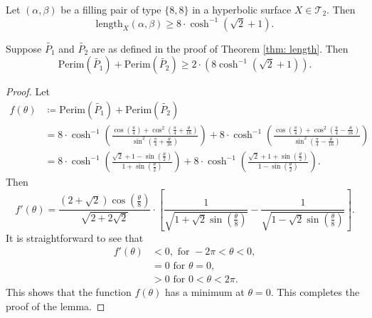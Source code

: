 \documentclass[10pt,a4paper]{amsart}
\begin{document}
\begin{theorem}\label{thm: length}
    Let $(\alpha, \beta)$ be a filling pair of type $\{8,8\}$ in a hyperbolic surface $X\in \mathcal{T}_2$. Then
    $$\mathrm{length}_X(\alpha,\beta) \geq 8\cdot\cosh^{-1}\left(\sqrt{2}+1\right).$$
\end{theorem}

\begin{lemma}\label{lem 1.2}
    Suppose $\tilde{P_1}$ and $\tilde{P_2}$ are as defined in the proof of Theorem \ref{thm: length}. Then 
    $$\mathrm{Perim}(\tilde{P_1})+\mathrm{Perim}(\tilde{P_2}) \geq 2\cdot (8\cosh^{-1}(\sqrt{2}+1)).$$
\end{lemma}

\begin{proof}
    Let
    \begin{align*}
        f(\theta)& \coloneqq \mathrm{Perim}(\tilde{P_1})+\mathrm{Perim}(\tilde{P_2})\\
    &=8 \cdot \cosh^{-1}\left(\frac{\cos\left(\frac{\pi}{4}\right)+\cos^2\left(\frac{\pi}{4}+\frac{\theta}{16}\right)}{\sin^2\left(\frac{\pi}{4}+\frac{\theta}{16}\right)}\right) + 8\cdot \cosh^{-1}\left(\frac{\cos\left(\frac{\pi}{4}\right)+\cos^2\left(\frac{\pi}{4}-\frac{\theta}{16}\right)}{\sin^2\left(\frac{\pi}{4}-\frac{\theta}{16}\right)}\right)\\
    &=8 \cdot \cosh^{-1} \left ({\frac{\sqrt{2}+1-\sin{\left (\frac{\theta}{2}\right)}}{1+\sin{\left (\frac{\theta}{2}\right)}}} \right ) + 8 \cdot \cosh^{-1}\left ({\frac{\sqrt{2}+1 + \sin{\left (\frac{\theta}{2}\right)}}{1 - \sin{\left (\frac{\theta}{2}\right)}}}\right).
    \end{align*}
    Then 
    $$f'(\theta) = \frac{(2 + \sqrt{2}) \cos{\left (\frac{\theta}{8}\right )}}{ \sqrt{2+2 \sqrt{2}
    }} \cdot \left[ \frac{1}{\sqrt{1+\sqrt{2} \sin {\left (\frac{\theta}{8}\right )}}} - \frac{1}{\sqrt{1 - \sqrt{2} \sin {\left (\frac{\theta}{8}\right )}}} \right].$$
    It is straightforward to see that
    \begin{align*}
        f'(\theta)&<0, \text{ for } -2\pi<\theta<0,\\
        &=0 \text{ for } \theta =0,\\
        &>0 \text{ for } 0<\theta <2 \pi.
    \end{align*}
    This shows that the function $f(\theta)$ has a minimum at $\theta =0$. This completes the proof of the lemma.
\end{proof}
\end{document}
